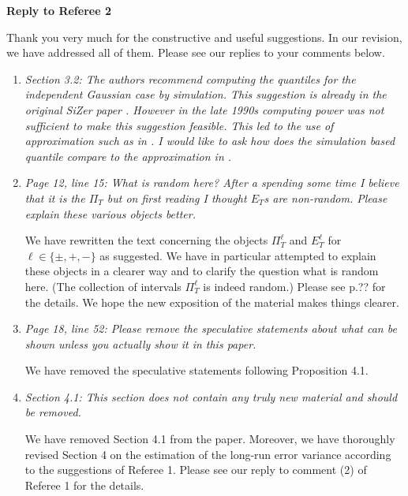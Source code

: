 \documentclass[a4paper,12pt]{article}
\begin{document}
\newpage
\begin{center}
{\large \bf Reply to Referee 2} 
\end{center}


Thank you very much for the constructive and useful suggestions. In our revision, we have addressed all of them. Please see our replies to your comments below.


\begin{enumerate}[label=(\arabic*),leftmargin=0.8cm]

\item \textit{Section 3.2: The authors recommend computing the quantiles for the independent Gaussian case by simulation. This suggestion is already in the original SiZer paper \citep{ChaudhuriMarron1999}. However in the late 1990s computing power was not sufficient to make this suggestion feasible. This led to the use of approximation such as in \cite{HannigMarron2006}. I would like to ask how does the simulation based quantile compare to the approximation in \cite{HannigMarron2006}.} 



\item \textit{Page 12, line 15: What is random here? After a spending some time I believe that it is the $\Pi_T$ but on first reading I thought $E_T$s are non-random. Please explain these various objects better.}

We have rewritten the text concerning the objects $\Pi_T^\ell$ and $E_T^\ell$ for $\ell \in \{\pm,+,-\}$ as suggested. We have in particular attempted to explain these objects in a clearer way and to clarify the question what is random here. (The collection of intervals $\Pi_T^\ell$ is indeed random.) Please see p.?? for the details. We hope the new exposition of the material makes things clearer.  


\item \textit{Page 18, line 52: Please remove the speculative statements about what can be shown unless you actually show it in this paper.}

We have removed the speculative statements following Proposition 4.1.


\item \textit{Section 4.1: This section does not contain any truly new material and should be removed.}

We have removed Section 4.1 from the paper. Moreover, we have thoroughly revised Section 4 on the estimation of the long-run error variance according to the suggestions of Referee 1. Please see our reply to comment (2) of Referee 1 for the details. 



\end{enumerate}
\end{document}
